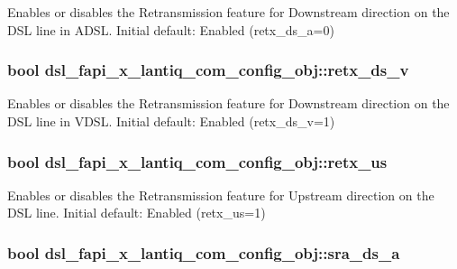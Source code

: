 Enables or disables the Retransmission feature for Downstream direction on the D\-S\-L line in A\-D\-S\-L. Initial default\-: Enabled (retx\-\_\-ds\-\_\-a=0) \hypertarget{structdsl__fapi__x__lantiq__com__config__obj_a3f2204e4f2999f9f8ec7dfc0a0cb5975}{
\subsubsection[{retx\-\_\-ds\-\_\-v}]{\setlength{\rightskip}{0pt plus 5cm}bool dsl\-\_\-fapi\-\_\-x\-\_\-lantiq\-\_\-com\-\_\-config\-\_\-obj\-::retx\-\_\-ds\-\_\-v}}\label{structdsl__fapi__x__lantiq__com__config__obj_a3f2204e4f2999f9f8ec7dfc0a0cb5975}
Enables or disables the Retransmission feature for Downstream direction on the D\-S\-L line in V\-D\-S\-L. Initial default\-: Enabled (retx\-\_\-ds\-\_\-v=1) \hypertarget{structdsl__fapi__x__lantiq__com__config__obj_a9b9b96db0accb1173f4b31060b1ecbc4}{
\subsubsection[{retx\-\_\-us}]{\setlength{\rightskip}{0pt plus 5cm}bool dsl\-\_\-fapi\-\_\-x\-\_\-lantiq\-\_\-com\-\_\-config\-\_\-obj\-::retx\-\_\-us}}\label{structdsl__fapi__x__lantiq__com__config__obj_a9b9b96db0accb1173f4b31060b1ecbc4}
Enables or disables the Retransmission feature for Upstream direction on the D\-S\-L line. Initial default\-: Enabled (retx\-\_\-us=1) \hypertarget{structdsl__fapi__x__lantiq__com__config__obj_a179dd89ab13693380c0f63cbec6aeeb8}{
\subsubsection[{sra\-\_\-ds\-\_\-a}]{\setlength{\rightskip}{0pt plus 5cm}bool dsl\-\_\-fapi\-\_\-x\-\_\-lantiq\-\_\-com\-\_\-config\-\_\-obj\-::sra\-\_\-ds\-\_\-a}}\label{structdsl__fapi__x__lantiq__com__config__obj_a179dd89ab13693380c0f63cbec6aeeb8}
